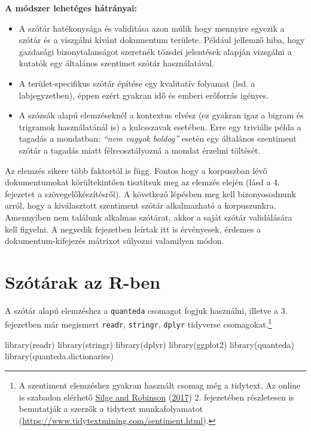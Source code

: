 \documentclass[
]{book}
\newenvironment{Shaded}{\begin{snugshade}}{\end{snugshade}}
\newcommand{\FunctionTok}[1]{\textcolor[rgb]{0.00,0.00,0.00}{#1}}
\newcommand{\NormalTok}[1]{#1}
\providecommand{\tightlist}{%
  \setlength{\itemsep}{0pt}\setlength{\parskip}{0pt}}
\begin{document}
\textbf{A módszer lehetéges hátrányai:}

\begin{itemize}
\tightlist
\item
  A szótár hatékonysága és validitása azon múlik hogy mennyire egyezik a
  szótár és a viszgálni kívánt dokumentum területe. Például jellemző
  hiba, hogy gazdasági bizonytalanságot szeretnék tőzsdei jelentések
  alapján vizsgálni a kutatók egy általános szentimet szótár
  használatával.
\item
  A terület-specifikus szótár építése egy kvalitatív folyamat (lsd. a
  labjegyzetben), éppen ezért gyakran idő és emberi erőforrás igényes.
\item
  A szózsák alapú elemzéseknél a kontextus elvész (ez gyakran igaz a
  bigram és trigramok használatánál is) a kulcsszavak esetében. Erre egy
  triviális példa a tagadás a mondatban: \emph{``nem vagyok boldog''}
  esetén egy általános szentiment szótár a tagadás miatt
  félreosztályozná a mondat érzelmi töltését.
\end{itemize}

Az elemzés sikere több faktortól is függ. Fontos hogy a korpuszban lévő
dokumentumokat körültekintően tisztítsuk meg az elemzés elején (lásd a
4. fejezetet a szövegelőkészítésről). A következő lépésben meg kell
bizonyosodnunk arról, hogy a kiválasztott szentiment szótár alkalmazható
a korpuszunkra. Amennyiben nem találunk alkalmas szótárat, akkor a saját
szótár validálására kell figyelni. A negyedik fejezetben leírtak itt is
érvényesek, érdemes a dokumentum-kifejezés mátrixot súlyozni valamilyen
módon.

\hypertarget{szuxf3tuxe1rak-az-r-ben}{%
\section{Szótárak az R-ben}\label{szuxf3tuxe1rak-az-r-ben}}

A szótár alapú elemzéshez a \texttt{quanteda} csomagot fogjuk használni,
illetve a 3. fejezetben már megismert \texttt{readr}, \texttt{stringr},
\texttt{dplyr} tidyverse csomagokat.\footnote{A szentiment elemzéshez
  gyakran használt csomag még a tidytext. Az online is szabadon elérhető
  \protect\hyperlink{ref-silge2017text}{Silge and Robinson}
  (\protect\hyperlink{ref-silge2017text}{2017}) 2. fejezetében
  részletesen is bemutatják a szerzők a tidytext munkafolyamatot
  (\url{https://www.tidytextmining.com/sentiment.html}).}

\begin{Shaded}
\begin{Highlighting}[]
\FunctionTok{library}\NormalTok{(readr)}
\FunctionTok{library}\NormalTok{(stringr)}
\FunctionTok{library}\NormalTok{(dplyr)}
\FunctionTok{library}\NormalTok{(ggplot2)}
\FunctionTok{library}\NormalTok{(quanteda)}
\FunctionTok{library}\NormalTok{(quanteda.dictionaries)}
\end{Highlighting}
\end{Shaded}
\end{document}
